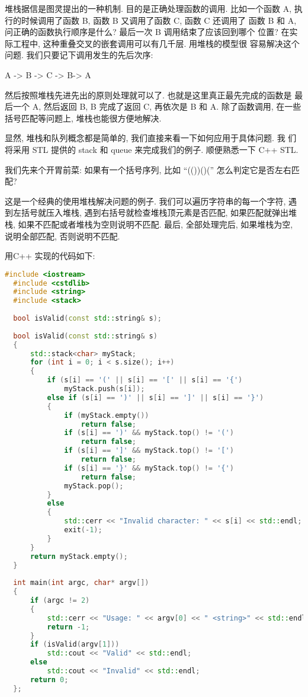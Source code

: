 \documentclass[a4paper]{ctexart}
\theoremstyle{definition}
\theoremstyle{definition}
\begin{document}
堆栈据信是图灵提出的一种机制. 目的是正确处理函数的调用. 比如一个函数
A, 执行的时候调用了函数 B, 函数 B 又调用了函数 C, 函数 C 还调用了 函数
B 和 A, 问正确的函数执行顺序是什么? 最后一次 B 调用结束了应该回到哪个
位置? 在实际工程中, 这种重叠交叉的嵌套调用可以有几千层. 用堆栈的模型很
容易解决这个问题. 我们只要记下调用发生的先后次序:

\begin{center}
A -> B -> C -> B-> A
\end{center}

然后按照堆栈先进先出的原则处理就可以了. 也就是这里真正最先完成的函数是
最后一个 A, 然后返回 B, B 完成了返回 C, 再依次是 B 和 A. 除了函数调用,
在一些括号匹配等问题上, 堆栈也能很方便地解决.

显然, 堆栈和队列概念都是简单的, 我们直接来看一下如何应用于具体问题. 我
们将采用 STL 提供的 stack 和 queue 来完成我们的例子. 顺便熟悉一下 C++
STL.

我们先来个开胃前菜: 如果有一个括号序列, 比如 ``(())()('' 怎么判定它是否左右匹配? 

这是一个经典的使用堆栈解决问题的例子. 我们可以遍历字符串的每一个字符, 遇到左括号就压入堆栈, 
遇到右括号就检查堆栈顶元素是否匹配, 如果匹配就弹出堆栈, 如果不匹配或者堆栈为空则说明不匹配. 
最后, 全部处理完后, 如果堆栈为空, 说明全部匹配, 否则说明不匹配.

用C++ 实现的代码如下:

\begin{lstlisting}[language=C++]
  #include <iostream>
  #include <cstdlib>
  #include <string>
  #include <stack>
  
  bool isValid(const std::string& s);
  
  bool isValid(const std::string& s) 
  {
      std::stack<char> myStack;
      for (int i = 0; i < s.size(); i++) 
      {
          if (s[i] == '(' || s[i] == '[' || s[i] == '{') 
              myStack.push(s[i]);
          else if (s[i] == ')' || s[i] == ']' || s[i] == '}')
          {
              if (myStack.empty()) 
                  return false;
              if (s[i] == ')' && myStack.top() != '(') 
                  return false;
              if (s[i] == ']' && myStack.top() != '[') 
                  return false;
              if (s[i] == '}' && myStack.top() != '{') 
                  return false;
              myStack.pop();
          }
          else
          {
              std::cerr << "Invalid character: " << s[i] << std::endl;
              exit(-1);
          }
      }
      return myStack.empty();
  }    
  
  int main(int argc, char* argv[])
  {
      if (argc != 2) 
      {
          std::cerr << "Usage: " << argv[0] << " <string>" << std::endl;
          return -1;
      }
      if (isValid(argv[1]))
          std::cout << "Valid" << std::endl;
      else
          std::cout << "Invalid" << std::endl;
      return 0;    
  };   
\end{lstlisting}
\end{document}
